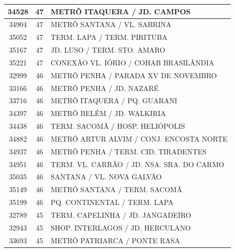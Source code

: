 \documentclass[
	12pt,				%
	oneside,			%
	a4paper,			%
	english,			%
	brazil				%
	]{abntex2ppgsi}
\begin{document}
\begin{apendicesenv}
\begin{longtable}{c|c|p{7cm}}
    34528 & 47    & METRÔ ITAQUERA / JD. CAMPOS \\
\hline

    34904 & 47    & METRÔ SANTANA / VL. SABRINA \\
\hline

    35052 & 47    & TERM. LAPA / TERM. PIRITUBA \\
\hline

    35167 & 47    & JD. LUSO / TERM. STO. AMARO \\
\hline

    35221 & 47    & CONEXÃO VL. IÓRIO / COHAB BRASILÂNDIA \\
\hline

    32999 & 46    & METRÔ PENHA / PARADA XV DE NOVEMBRO \\
\hline

    33166 & 46    & METRÔ PENHA / JD. NAZARÉ \\
\hline

    33716 & 46    & METRÔ ITAQUERA / PQ. GUARANI \\
\hline

    34397 & 46    & METRÔ BELÉM / JD. WALKIRIA \\
\hline

    34438 & 46    & TERM. SACOMÃ / HOSP. HELIÓPOLIS \\
\hline

    34882 & 46    & METRÔ ARTUR ALVIM / CONJ. ENCOSTA NORTE \\
\hline

    34937 & 46    & METRÔ PENHA / TERM. CID. TIRADENTES \\
\hline

    34951 & 46    & TERM. VL. CARRÃO / JD. NSA. SRA. DO CARMO \\
\hline

    35035 & 46    & SANTANA / VL. NOVA GALVÃO \\
\hline

    35149 & 46    & METRÔ SANTANA / TERM. SACOMÃ \\
\hline

    35199 & 46    & PQ. CONTINENTAL / TERM. LAPA \\
\hline

    32789 & 45    & TERM. CAPELINHA / JD. JANGADEIRO \\
\hline

    32943 & 45    & SHOP. INTERLAGOS / JD. HERCULANO \\
\hline

    33693 & 45    & METRÔ PATRIARCA / PONTE RASA \\
\hline


\end{longtable}
\end{apendicesenv}
\end{document}
